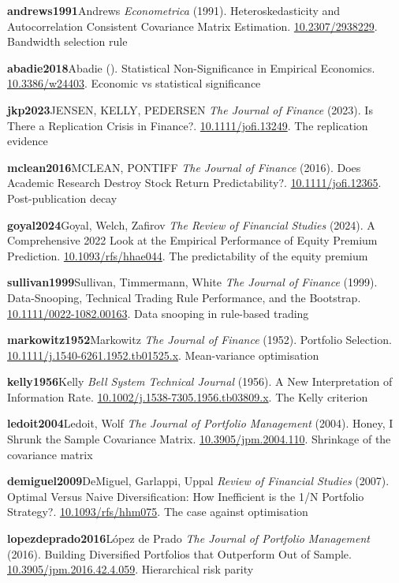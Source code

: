 \noindent\textbf{andrews1991}\quad Andrews \emph{Econometrica} (1991). Heteroskedasticity and Autocorrelation Consistent Covariance Matrix Estimation. \url{10.2307/2938229}. Bandwidth selection rule\par
\noindent\textbf{abadie2018}\quad Abadie \emph{} (). Statistical Non-Significance in Empirical Economics. \url{10.3386/w24403}. Economic vs statistical significance\par
\noindent\textbf{jkp2023}\quad JENSEN, KELLY, PEDERSEN \emph{The Journal of Finance} (2023). Is There a Replication Crisis in Finance?. \url{10.1111/jofi.13249}. The replication evidence\par
\noindent\textbf{mclean2016}\quad MCLEAN, PONTIFF \emph{The Journal of Finance} (2016). Does Academic Research Destroy Stock Return Predictability?. \url{10.1111/jofi.12365}. Post-publication decay\par
\noindent\textbf{goyal2024}\quad Goyal, Welch, Zafirov \emph{The Review of Financial Studies} (2024). A Comprehensive 2022 Look at the Empirical Performance of Equity Premium Prediction. \url{10.1093/rfs/hhae044}. The predictability of the equity premium\par
\noindent\textbf{sullivan1999}\quad Sullivan, Timmermann, White \emph{The Journal of Finance} (1999). Data-Snooping, Technical Trading Rule Performance, and the Bootstrap. \url{10.1111/0022-1082.00163}. Data snooping in rule-based trading\par
\noindent\textbf{markowitz1952}\quad Markowitz \emph{The Journal of Finance} (1952). Portfolio Selection. \url{10.1111/j.1540-6261.1952.tb01525.x}. Mean-variance optimisation\par
\noindent\textbf{kelly1956}\quad Kelly \emph{Bell System Technical Journal} (1956). A New Interpretation of Information Rate. \url{10.1002/j.1538-7305.1956.tb03809.x}. The Kelly criterion\par
\noindent\textbf{ledoit2004}\quad Ledoit, Wolf \emph{The Journal of Portfolio Management} (2004). Honey, I Shrunk the Sample Covariance Matrix. \url{10.3905/jpm.2004.110}. Shrinkage of the covariance matrix\par
\noindent\textbf{demiguel2009}\quad DeMiguel, Garlappi, Uppal \emph{Review of Financial Studies} (2007). Optimal Versus Naive Diversification: How Inefficient is the 1/N Portfolio Strategy?. \url{10.1093/rfs/hhm075}. The case against optimisation\par
\noindent\textbf{lopezdeprado2016}\quad López de Prado \emph{The Journal of Portfolio Management} (2016). Building Diversified Portfolios that Outperform Out of Sample. \url{10.3905/jpm.2016.42.4.059}. Hierarchical risk parity\par
